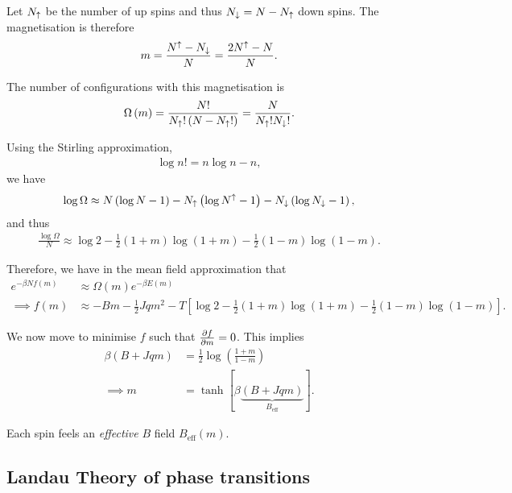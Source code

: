 
Let $N_{\uparrow}$ be the number of up spins and thus $N_{\downarrow} = N - N_{\uparrow}$ down spins. The magnetisation is therefore
\begin{align}
    m = \frac{N^{\uparrow} - N_\downarrow}{N} = \frac{2N^{\uparrow} - N}{N}
.\end{align}

The number of configurations with this magnetisation is
\begin{align}
    \Omega \left( m \right) = \frac{N!}{N_\uparrow ! \left( N - N_{\uparrow}! \right)} = \frac{N}{N_{\uparrow}! N_\downarrow !}
.\end{align}

Using the Stirling approximation,
\begin{align}
    \log n! = n \log n - n
,\end{align}
we have
\begin{align}
    \log \Omega \approx N \left( \log N - 1 \right)  - N_\uparrow \left( \log N^{\uparrow} - 1 \right) - N_{\downarrow} \left( \log N_\downarrow - 1 \right) 
,\end{align}
and thus
\begin{align}
    \frac{\log \Omega}{N} \approx \log 2 - \frac{1}{2} \left( 1 + m \right) \log \left( 1 + m \right) - \frac{1}{2} \left( 1 - m \right) \log \left( 1 - m \right) 
.\end{align}

Therefore, we have in the mean field approximation that
\begin{align}
    e^{-\beta N f\left( m \right) } &\approx \Omega \left( m \right) e^{-\beta E \left( m \right) } \\
    \implies f\left( m \right) &\approx - Bm - \frac{1}{2} J q m^2 - T \left[ \log 2 - \frac{1}{2} \left( 1 + m \right)  \log \left( 1 + m \right) - \frac{1}{2} \left( 1 - m \right) \log \left( 1 - m \right)  \right] 
.\end{align}

We now move to minimise $f$ such that $\pdv{f}{m} = 0$. This implies
\begin{align}
    \beta \left( B + J q m \right) &= \frac{1}{2} \log \left( \frac{1 + m}{1 - m} \right)  \\
    \implies m &= \tanh \left[ \beta \underbrace{\left( B + Jqm \right)}_{B_\text{eff}}  \right] 
.\end{align}

Each spin feels an \textit{effective} $B$ field $B_\text{eff}\left( m \right) $.

\subsection{Landau Theory of phase transitions}

